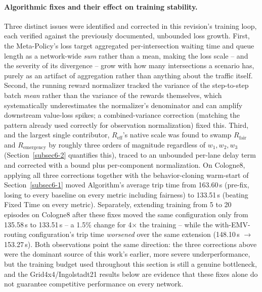 \documentclass[3p,times]{elsarticle}
\theoremstyle{plain}
\theoremstyle{definition}
\begin{document}
\paragraph{Algorithmic fixes and their effect on training stability.}
Three distinct issues were identified and corrected in this revision's
training loop, each verified against the previously documented,
unbounded loss growth. First, the Meta-Policy's loss target aggregated
per-intersection waiting time and queue length as a network-wide
\emph{sum} rather than a mean, making the loss scale -- and the
severity of its divergence -- grow with how many intersections a
scenario has, purely as an artifact of aggregation rather than
anything about the traffic itself. Second, the running reward
normalizer tracked the variance of the step-to-step batch
\emph{mean} rather than the variance of the rewards themselves, which
systematically underestimates the normalizer's denominator and can
amplify downstream value-loss spikes; a combined-variance correction
(matching the pattern already used correctly for observation
normalization) fixed this. Third, and the largest single contributor,
$R_{\mathrm{eff}}$'s native scale was found to swamp
$R_{\mathrm{fair}}$ and $R_{\mathrm{emergency}}$ by roughly three
orders of magnitude regardless of $w_1, w_2, w_3$ (Section~\ref{subsec6-2}
quantifies this), traced to an unbounded per-lane delay term and
corrected with a bound plus per-component normalization. On Cologne8,
applying all three corrections together with the behavior-cloning
warm-start of Section~\ref{subsec6-1} moved Algorithm's average trip
time from 163.60\,s (pre-fix, losing to every baseline on every
metric including fairness) to 133.51\,s (beating Fixed Time on every
metric). Separately, extending training from 5 to 20 episodes on
Cologne8 after these fixes moved the same configuration only from
135.58\,s to 133.51\,s -- a 1.5\% change for 4$\times$ the training --
while the with-EMV-routing configuration's trip time \emph{worsened}
over the same extension (148.10\,s $\to$ 153.27\,s). Both observations
point the same direction: the three corrections above were the
dominant source of this work's earlier, more severe underperformance,
but the training budget used throughout this section is still a
genuine bottleneck, and the Grid4x4/Ingolstadt21 results below are
evidence that these fixes alone do not guarantee competitive
performance on every network.
\end{document}
